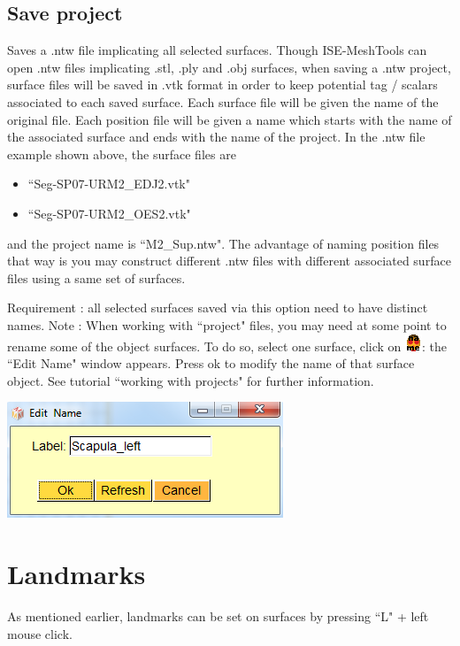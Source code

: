 \subsection{Save project}
Saves a .ntw file implicating all selected surfaces. Though ISE-MeshTools can open .ntw files
implicating .stl, .ply and .obj surfaces, when saving a .ntw project, surface files will be saved in .vtk format in order to keep potential tag / scalars associated to each saved surface. Each surface file will be given the name of the original file. Each position file will be given a name which starts with the name of the associated surface and ends with the name of the project. In the .ntw file example shown above, the surface files are 
\begin{itemize}
\item ``Seg-SP07-URM2\_EDJ2.vtk" 
\item ``Seg-SP07-URM2\_OES2.vtk"
\end{itemize}
and the project name is ``M2\_Sup.ntw". The advantage of naming position files that way is you may construct different .ntw files with different associated surface files using a same set of surfaces.


\begin{minipage}{0.5\textwidth}
Requirement : all selected surfaces saved via this option
need to have distinct names.
Note : When working with ``project" files, you may need at
some point to rename some of the object surfaces. To do so,
select one surface, click on \includegraphics[scale=0.7]{images/pixmap/name.png}: the ``Edit Name" window appears.
Press ok to modify the name of that surface object.
See tutorial ``working with projects" for further information.
\end{minipage}  
 \begin{minipage}{0.5\textwidth}\centering
  \includegraphics[scale=0.5]{images/Icons/edit_name.png}
 \end{minipage} 


\section{Landmarks}
As mentioned earlier, landmarks can be set on surfaces by pressing ``L" + left mouse click.\\

